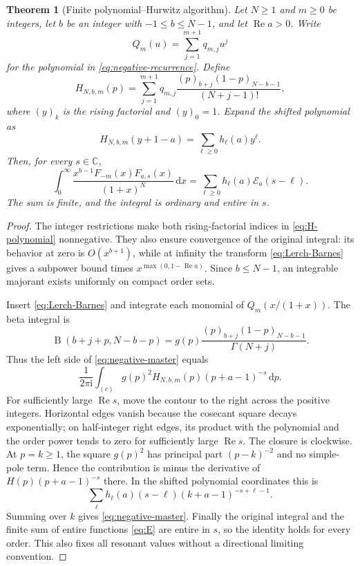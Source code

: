 \documentclass[11pt]{article}
\numberwithin{equation}{section}
\newtheorem{theorem}{Theorem}[section]
\theoremstyle{definition}
\DeclareMathOperator{\Rea}{Re}
\DeclareMathOperator{\B}{B}
\newcommand{\C}{\mathbb C}
\newcommand{\dd}{\,\mathrm d}
\newcommand{\ii}{\mathrm i}
\newcommand{\EE}{\mathcal E}
\begin{document}
\begin{theorem}[Finite polynomial--Hurwitz algorithm]\label{thm:negative-closure}
Let $N\ge1$ and $m\ge0$ be integers, let $b$ be an integer with $-1\le b\le N-1$, and let $\Rea a>0$. Write
\[
 Q_m(u)=\sum_{j=1}^{m+1}q_{m,j}u^j
\]
for the polynomial in \eqref{eq:negative-recurrence}. Define
\begin{equation}\label{eq:H-polynomial}
 H_{N,b,m}(p)=\sum_{j=1}^{m+1}
 q_{m,j}\frac{(p)_{b+j}(1-p)_{N-b-1}}{(N+j-1)!},
\end{equation}
where $(y)_k$ is the rising factorial and $(y)_0=1$. Expand the shifted polynomial as
\[
 H_{N,b,m}(y+1-a)=\sum_{\ell\ge0}h_\ell(a)y^\ell.
\]
Then, for every $s\in\C$,
\begin{equation}\label{eq:negative-master}
 \boxed{\displaystyle
 \int_0^\infty\frac{x^{b-1}F_{-m}(x)F_{a,s}(x)}{(1+x)^N}\dd x
 =\sum_{\ell\ge0}h_\ell(a)\EE_a(s-\ell).}
\end{equation}
The sum is finite, and the integral is ordinary and entire in $s$.
\end{theorem}
\begin{proof}
The integer restrictions make both rising-factorial indices in \eqref{eq:H-polynomial} nonnegative. They also ensure convergence of the original integral: its behavior at zero is $O(x^{b+1})$, while at infinity the transform \eqref{eq:Lerch-Barnes} gives a subpower bound times $x^{\max(0,1-\Rea a)}$. Since $b\le N-1$, an integrable majorant exists uniformly on compact order sets.

Insert \eqref{eq:Lerch-Barnes} and integrate each monomial of $Q_m(x/(1+x))$. The beta integral is
\[
 \B(b+j+p,N-b-p)
 =g(p)\frac{(p)_{b+j}(1-p)_{N-b-1}}{\Gamma(N+j)}.
\]
Thus the left side of \eqref{eq:negative-master} equals
\begin{equation}\label{eq:negative-contour}
 \frac1{2\pi\ii}\int_{(c)}g(p)^2H_{N,b,m}(p)(p+a-1)^{-s}\dd p.
\end{equation}
For sufficiently large $\Rea s$, move the contour to the right across the positive integers. Horizontal edges vanish because the cosecant square decays exponentially; on half-integer right edges, its product with the polynomial and the order power tends to zero for sufficiently large $\Rea s$. The closure is clockwise. At $p=k\ge1$, the square $g(p)^2$ has principal part $(p-k)^{-2}$ and no simple-pole term. Hence the contribution is minus the derivative of $H(p)(p+a-1)^{-s}$ there. In the shifted polynomial coordinates this is
\[
 \sum_\ell h_\ell(a)(s-\ell)(k+a-1)^{-s+\ell-1}.
\]
Summing over $k$ gives \eqref{eq:negative-master}. Finally the original integral and the finite sum of entire functions \eqref{eq:E} are entire in $s$, so the identity holds for every order. This also fixes all resonant values without a directional limiting convention.
\end{proof}
\end{document}
